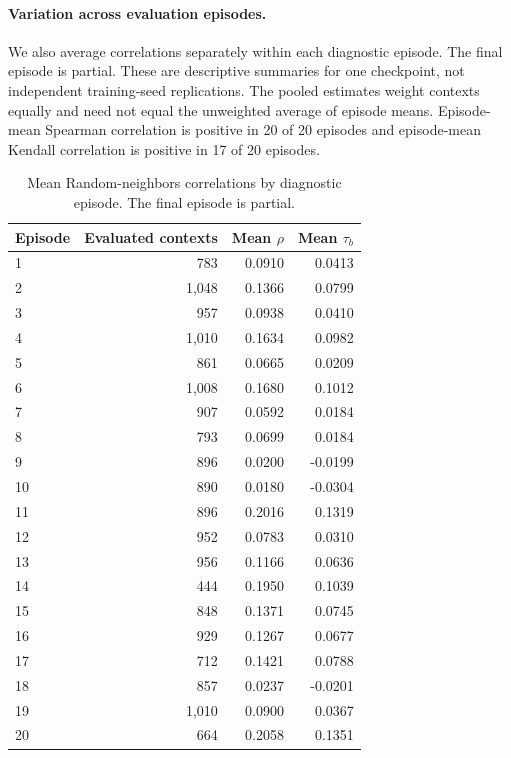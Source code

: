 \paragraph{Variation across evaluation episodes.}
We also average correlations separately within each diagnostic episode. The final episode is partial. These are descriptive summaries for one checkpoint, not independent training-seed replications. The pooled estimates weight contexts equally and need not equal the unweighted average of episode means. Episode-mean Spearman correlation is positive in 20 of 20 episodes and episode-mean Kendall correlation is positive in 17 of 20 episodes.

\begin{table}[!htbp]
\centering
\small
\caption{Mean Random-neighbors correlations by diagnostic episode. The final episode is partial.}
\label{tab:random11010_episodes}
\begin{tabular}{lrrr}
\toprule
Episode & Evaluated contexts & Mean $\rho$ & Mean $\tau_b$ \\
\midrule
1 & 783 & 0.0910 & 0.0413 \\
2 & 1,048 & 0.1366 & 0.0799 \\
3 & 957 & 0.0938 & 0.0410 \\
4 & 1,010 & 0.1634 & 0.0982 \\
5 & 861 & 0.0665 & 0.0209 \\
6 & 1,008 & 0.1680 & 0.1012 \\
7 & 907 & 0.0592 & 0.0184 \\
8 & 793 & 0.0699 & 0.0184 \\
9 & 896 & 0.0200 & -0.0199 \\
10 & 890 & 0.0180 & -0.0304 \\
11 & 896 & 0.2016 & 0.1319 \\
12 & 952 & 0.0783 & 0.0310 \\
13 & 956 & 0.1166 & 0.0636 \\
14 & 444 & 0.1950 & 0.1039 \\
15 & 848 & 0.1371 & 0.0745 \\
16 & 929 & 0.1267 & 0.0677 \\
17 & 712 & 0.1421 & 0.0788 \\
18 & 857 & 0.0237 & -0.0201 \\
19 & 1,010 & 0.0900 & 0.0367 \\
20 & 664 & 0.2058 & 0.1351 \\
\bottomrule
\end{tabular}
\end{table}

